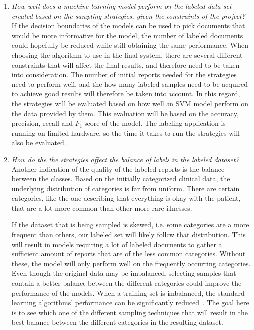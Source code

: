 \begin{enumerate}
      \item \label{intro:re-q1} 
      \textit{How well does a machine learning model perform on the labeled data set created based on the sampling strategies, given the constraints of the project?}
      \newline
      If the decision boundaries of the models can be used to pick documents that would be more informative for the model, the number of labeled documents could hopefully be reduced while still obtaining the same performance.
      When choosing the algorithm to use in the final system, there are several different constraints that will affect the final results, and therefore need to be taken into consideration.
      The number of initial reports needed for the strategies need to perform well, and the how many labeled samples need to be acquired to achieve good results will therefore be taken into account.
      In this regard, the strategies will be evaluated based on how well an SVM model perform on the data provided by them.
      This evaluation will be based on the accuracy, precision, recall and $F_1$-score of the model.
      The labeling application is running on limited hardware, so the time it takes to run the strategies will also be evaluated.

      \item \label{intro:re-q2}
      \textit{How do the the strategies affect the balance of labels in the labeled dataset?}
      \newline
      Another indication of the quality of the labeled reports is the balance between the classes.
      Based on the initially categorized clinical data, the underlying distribution of categories is far from uniform.
      There are certain categories, like the one describing that everything is okay with the patient, that are a lot more common than other more rare illnesses.

      If the dataset that is being sampled is skewed, i.e. some categories are a more frequent than others, our labeled set will likely follow that distribution.
      This will result in models requiring a lot of labeled documents to gather a sufficient amount of reports that are of the less common categories.
      Without these, the model will only perform well on the frequently occurring categories.
      Even though the original data may be imbalanced, selecting samples that contain a better balance between the different categories could improve the performance of the models.
      When a training set is imbalanced, the standard learning algorithms' performance can be significantly reduced~\cite{he2009learning}.
      The goal here is to see which one of the different sampling techniques that will result in the best balance between the different categories in the resulting dataset.

\end{enumerate}

